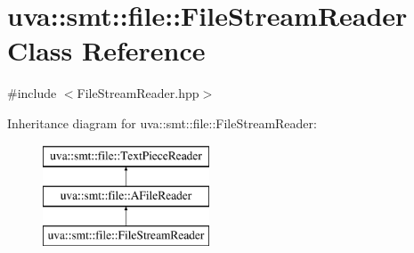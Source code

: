 \hypertarget{classuva_1_1smt_1_1file_1_1_file_stream_reader}{}\section{uva\+:\+:smt\+:\+:file\+:\+:File\+Stream\+Reader Class Reference}
\label{classuva_1_1smt_1_1file_1_1_file_stream_reader}


{\ttfamily \#include $<$File\+Stream\+Reader.\+hpp$>$}

Inheritance diagram for uva\+:\+:smt\+:\+:file\+:\+:File\+Stream\+Reader\+:\begin{figure}[H]
\begin{center}
\leavevmode
\includegraphics[height=3.000000cm]{classuva_1_1smt_1_1file_1_1_file_stream_reader}
\end{center}
\end{figure}
